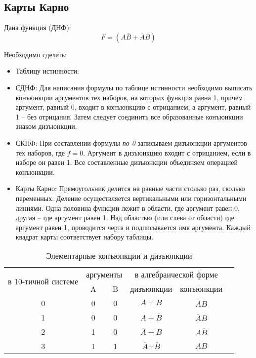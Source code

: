 \subsection{Карты Карно}
Дана функция (ДНФ):
$$
F=(A\overline{B} + \overline{A}B)
$$

Необходимо сделать: 
\begin{itemize}
\item Таблицу истинности:
\item СДНФ: Для написания формулы по таблице истинности необходимо выписать конъюнкции 
аргументов тех наборов, на которых функция равна 1, причем аргумент, равный 0, входит 
в конъюнкцию с отрицанием, а аргумент, равный 1 -- без отрицания. Затем следует соединить 
все образованные конъюнкции знаком дизъюнкции.
\item СКНФ: При составлении формулы {\it по 0} записываем дизъюнкции аргументов тех 
наборов, где $f=0$. Аргумент в дизъюнкцию входит с отрицанием, если в наборе он равен 1. 
Все составленные дизъюнкции объединяем операцией конъюнкции.
\item Карты Карно: Прямоугольник делится на равные части столько раз, сколько переменных. 
Деление осуществляется вертикальными или горизонтальными линиями. Одна половина функции 
лежит в области, где аргумент равен 0, другая -- где аргумент равен 1. Над областью (или 
слева от области) где аргумент равен 1, проводится черта и подписывается имя аргумента. 
Каждый квадрат карты соответствует набору таблицы.
\end{itemize}


\begin{table}[ht]
  \centering%
\begin{tabular}{@{} cccccc @{}}
\toprule
\multirow{2}{*}{в 10-тичной системе}&\multicolumn{2}{|c|}{аргументы}& 
\multicolumn{2}{|c|}{в алгебраической форме}\\
\cmidrule{2-5}&
\multicolumn{1}{|c|}{A}&\multicolumn{1}{|c|}{B}& \multicolumn{1}{|c|}{дизъюнкции}&
\multicolumn{1}{|c|}{конъюнкции}\\
\midrule 
0 & 0 & 0 &  $A+B$ & $\bar{A}\bar{B}$ \\
1 & 0 & 0 &  $A+\overline{B}$ & $\overline{A}B$\\
2 & 1 & 0 &  $\overline{A}+B$ & $A\overline{B}$\\
3 & 1 & 1 & $\overline{A}$+$\overline{B}$ & $AB$ \\ 
\bottomrule
\end{tabular}
\caption{Элементарные конъюнкции и дизъюнкции}\label{tab:table_init}
\end{table} 

